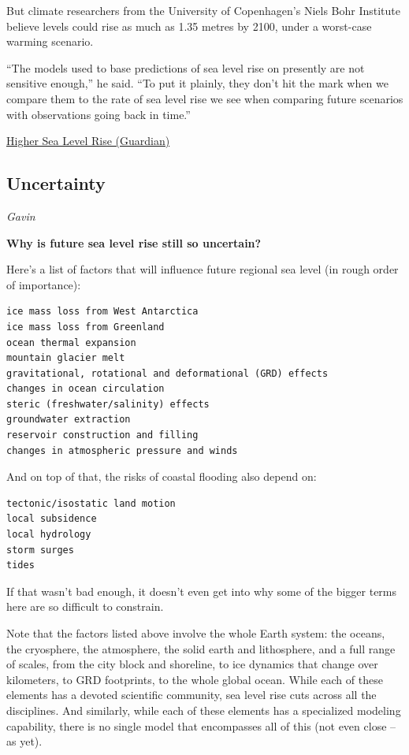 \documentclass[
]{book}
\begin{document}
But climate researchers from the University of Copenhagen's Niels Bohr Institute believe levels could rise as much as 1.35 metres by 2100, under a worst-case warming scenario.

``The models used to base predictions of sea level rise on presently are not sensitive enough,'' he said. ``To put it plainly, they don't hit the mark when we compare them to the rate of sea level rise we see when comparing future scenarios with observations going back in time.''

\href{https://www.theguardian.com/environment/2021/feb/02/sea-level-rise-could-be-worse-than-feared-warn-researchers}{Higher Sea Level Rise (Guardian)}

\hypertarget{uncertainty}{%
\subsection{Uncertainty}\label{uncertainty}}

\emph{Gavin}

\textbf{Why is future sea level rise still so uncertain?}

Here's a list of factors that will influence future regional sea level (in rough order of importance):

\begin{verbatim}
ice mass loss from West Antarctica
ice mass loss from Greenland
ocean thermal expansion
mountain glacier melt
gravitational, rotational and deformational (GRD) effects
changes in ocean circulation
steric (freshwater/salinity) effects
groundwater extraction
reservoir construction and filling
changes in atmospheric pressure and winds
\end{verbatim}

And on top of that, the risks of coastal flooding also depend on:

\begin{verbatim}
tectonic/isostatic land motion
local subsidence
local hydrology
storm surges
tides
\end{verbatim}

If that wasn't bad enough, it doesn't even get into why some of the bigger terms here are so difficult to constrain.

Note that the factors listed above involve the whole Earth system: the oceans, the cryosphere, the atmosphere, the solid earth and lithosphere, and a full range of scales, from the city block and shoreline, to ice dynamics that change over kilometers, to GRD footprints, to the whole global ocean. While each of these elements has a devoted scientific community, sea level rise cuts across all the disciplines. And similarly, while each of these elements has a specialized modeling capability, there is no single model that encompasses all of this (not even close -- as yet).
\end{document}
